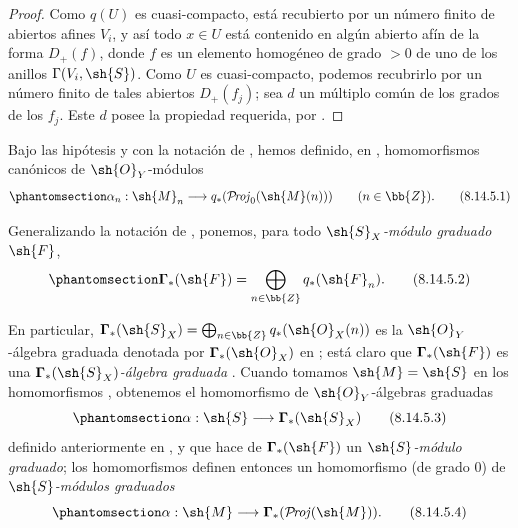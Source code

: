 \documentclass[oneside,10pt]{amsart}
\makeatletter
\newcommand{\ega@arrow}[2]{\mathchoice{#1}{#2}{#2}{#2}}
\renewcommand{\to}{\ega@arrow{\longrightarrow}{\rightarrow}}
\def\shProj{\mathcal{P}\!\mathit{roj}}
\newcommand{\oldpage}[2][]{\marginnote{\normalfont\footnotesize\textbf{#1}~|~#2}\ignorespaces}
\let\EGAOriginalLabel\label
\renewcommand{\label}[1]{\phantomsection\EGAOriginalLabel{#1}}
\makeatother
\begin{document}
\begin{proof}
Como $q(U)$ es cuasi-compacto, está recubierto por un número finito de abiertos afines $V_i$, y así todo $x\in U$ está contenido en algún abierto afín de la forma $D_+(f)$, donde $f$ es un elemento homogéneo de grado $>0$ de uno de los anillos $\Gamma(V_i,\sh{S})$.
Como $U$ es cuasi-compacto, podemos recubrirlo por un número finito de tales abiertos $D_+(f_j)$;
sea $d$ un múltiplo común de los grados de los $f_j$.
Este $d$ posee la propiedad requerida, por .
\end{proof}

\begin{env}[8.14.5]
\label{II.8.14.5}
Bajo las hipótesis y con la notación de , hemos definido, en , homomorfismos canónicos de $\sh{O}_Y$-módulos
\[
\label{II.8.14.5.1}
    \alpha_n: \sh{M}_n \to q_*(\shProj_0(\sh{M}(n)))
    \qquad (n\in\bb{Z}).
\tag{8.14.5.1}
\]

Generalizando la notación de , ponemos, para todo \emph{$\sh{S}_X$-módulo graduado $\sh{F}$},
\[
\label{II.8.14.5.2}
    \boldsymbol{\Gamma}_*(\sh{F}) = \bigoplus_{n\in\bb{Z}}q_*(\sh{F}_n).
\tag{8.14.5.2}
\]

En particular, $\boldsymbol{\Gamma}_*(\sh{S}_X)=\bigoplus_{n\in\bb{Z}}q_*(\sh{O}_X(n))$ es la $\sh{O}_Y$-álgebra graduada denotada por $\boldsymbol{\Gamma}_*(\sh{O}_X)$ en ;
está claro que $\boldsymbol{\Gamma}_*(\sh{F})$ es una \emph{$\boldsymbol{\Gamma}_*(\sh{S}_X)$-álgebra graduada} .
Cuando
\oldpage[II]{199}
tomamos $\sh{M}=\sh{S}$ en los homomorfismos , obtenemos el homomorfismo de $\sh{O}_Y$-álgebras graduadas
\[
\label{II.8.14.5.3}
    \alpha:\sh{S}\to\boldsymbol{\Gamma}_*(\sh{S}_X)
\tag{8.14.5.3}
\]
definido anteriormente en , y que hace de $\boldsymbol{\Gamma}_*(\sh{F})$ un \emph{$\sh{S}$-módulo graduado};
los homomorfismos  definen entonces un homomorfismo (de grado $0$) de \emph{$\sh{S}$-módulos graduados}
\[
\label{II.8.14.5.4}
    \alpha:\sh{M}\to\boldsymbol{\Gamma}_*(\shProj(\sh{M})).
\tag{8.14.5.4}
\]
\end{env}
\end{document}
